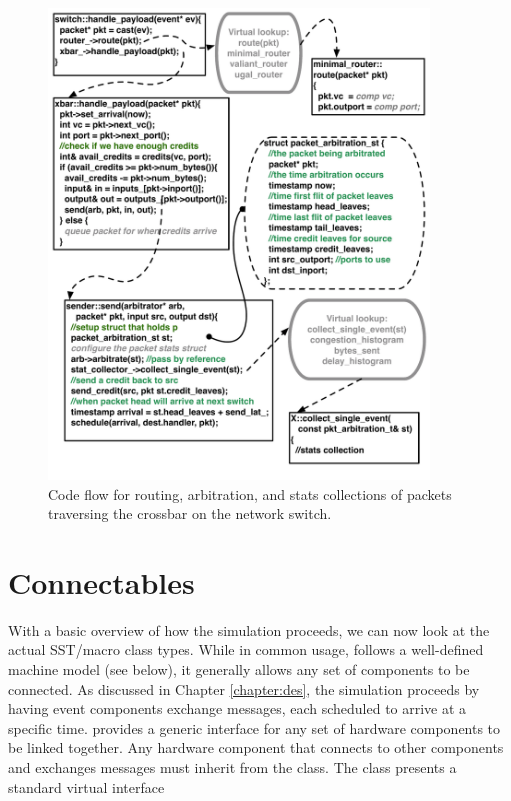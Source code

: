 \begin{figure}
\includegraphics[width=0.9\textwidth]{figures/RoutingFlow}
\caption{Code flow for routing, arbitration, and stats collections of packets traversing the crossbar on the network switch.}
\label{fig:xbarFlow}
\end{figure}

\section{Connectables}
\label{sec:connectables}
With a basic overview of how the simulation proceeds, we can now look at the actual SST/macro class types.
While in common usage, \sstmacro follows a well-defined machine model (see below),
it generally allows any set of components to be connected. 
As discussed in Chapter \ref{chapter:des}, the simulation proceeds by having event components exchange messages,
each scheduled to arrive at a specific time.
\sstmacro provides a generic interface for any set of hardware components to be linked together.
Any hardware component that connects to other components and exchanges messages must inherit from the  class.
The  class presents a standard virtual interface

